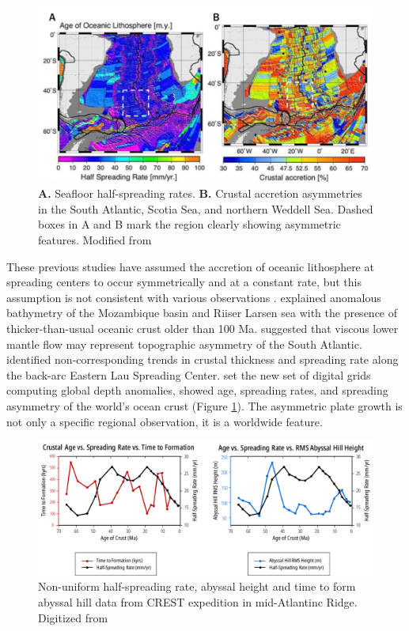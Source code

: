 \documentclass[letterpaper,12pt,notitle]{memphisthesis}                     %
\begin{document}
\begin{figure}[!htb]
	\centering
	\includegraphics[width=0.9\linewidth]{./figs/hsr_muller.png}
	\caption{\textbf{A.} Seafloor half-spreading rates. \textbf{B.} Crustal accretion asymmetries in the South Atlantic, Scotia Sea, and northern Weddell Sea. Dashed boxes in A and B mark the region clearly showing asymmetric features. Modified from \citet{Muller2008}}
	\label{fig:hsr_muller}
\end{figure}

These previous studies have assumed the accretion of oceanic lithosphere at spreading centers to occur symmetrically and at a constant rate, but this assumption is not consistent with various observations \citep{Castelino2016, Flament2014, Martinez2006, Muller1998, Muller2008, Fedotova2017}. \citet{Castelino2016} explained anomalous bathymetry of the Mozambique basin and Riiser Larsen sea with the presence of thicker-than-usual oceanic crust older than 100 Ma. \citet{Flament2014} suggested that viscous lower mantle flow may represent topographic asymmetry of the South Atlantic. \citet{Martinez2006} identified non-corresponding trends in crustal thickness and spreading rate along the back-arc Eastern Lau Spreading Center. \citet{Muller2008} set the new set of digital grids computing global depth anomalies, showed age, spreading rates, and spreading asymmetry of the world’s ocean crust (Figure \ref{fig:hsr_muller}). The asymmetric plate growth is not only a specific regional observation, it is a worldwide feature.
%
\begin{figure}[!htb]
	\centering
	\includegraphics[width=0.99\linewidth]{./figs/hsrgraph1.pdf}
	\caption{Non-uniform half-spreading rate, abyssal height and time to form abyssal hill data from CREST expedition in mid-Atlantinc Ridge. Digitized from \citet{Fedotova2017}}
	\label{fig:hsr_fedotova}
\end{figure}
\end{document}
